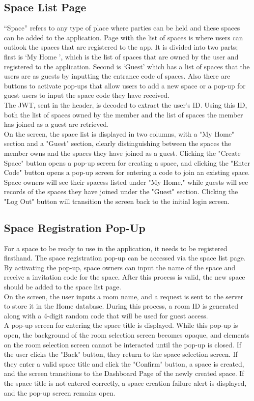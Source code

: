 \documentclass[conference]{IEEEtran}
\begin{document}
    \subsection{Space List Page}
        “Space” refers to any type of place where parties can be held and these spaces can be added to the application. Page with the list of spaces is where users can outlook the spaces that are registered to the app. It is divided into two parts; first is ‘My Home ', which is the list of spaces that are owned by the user and registered to the application. Second is ‘Guest’ which has a list of spaces that the users are as guests by inputting the entrance code of spaces. Also there are buttons to activate pop-ups that allow users to add a new space or a pop-up for guest users to input the space code they have received.\\
        The JWT, sent in the header, is decoded to extract the user's ID. Using this ID, both the list of spaces owned by the member and the list of spaces the member has joined as a guest are retrieved.\\
        On the screen, the space list is displayed in two columns, with a "My Home" section and a "Guest" section, clearly distinguishing between the spaces the member owns and the spaces they have joined as a guest.  Clicking the "Create Space" button opens a pop-up screen for creating a space, and clicking the "Enter Code" button opens a pop-up screen for entering a code to join an existing space. Space owners will see their spacess listed under "My Home," while guests will see records of the spaces they have joined under the "Guest" section.  Clicking the "Log Out" button will transition the screen back to the initial login screen.
    \subsection{Space Registration Pop-Up}
        For a space to be ready to use in the application, it needs to be registered firsthand. The space registration pop-up can be accessed via the space list page. By activating the pop-up, space owners can input the name of the space and receive a invitation code for the space. After this process is valid, the new space should be added to the space list page.\\
        On the screen, the user inputs a room name, and a request is sent to the server to store it in the Home database. During this process, a room ID is generated along with a 4-digit random code that will be used for guest access. \\
        A pop-up screen for entering the space title is displayed. While this pop-up is open, the background of the room selection screen becomes opaque, and elements on the room selection screen cannot be interacted until the pop-up is closed. If the user clicks the "Back" button, they return to the space selection screen. If they enter a valid space title and click the "Confirm" button, a space is created, and the screen transitions to the Dashboard Page of the newly created space. If the space title is not entered correctly, a space creation failure alert is displayed, and the pop-up screen remains open.
\end{document}
